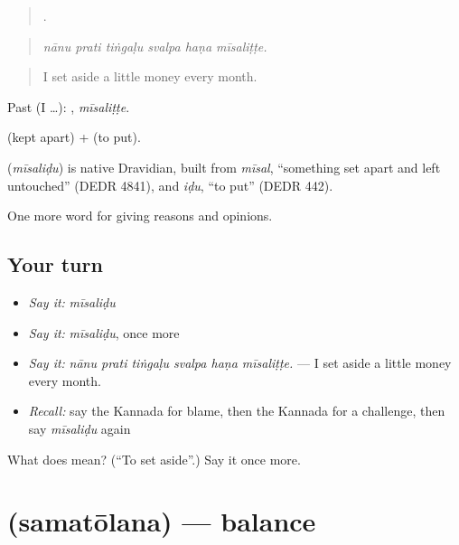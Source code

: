 \begin{quote}
     .
\end{quote}

\begin{quote}
\emph{nānu prati tiṅgaḷu svalpa haṇa mīsaliṭṭe.}
\end{quote}

\begin{quote}
I set aside a little money every month.
\end{quote}

Past (I …): , \emph{mīsaliṭṭe}.

 (kept apart) +  (to put).

\begin{cousinweb}
\textbf{} (\emph{mīsaliḍu}) is native Dravidian, built from \emph{mīsal}, \textquotedblleft{}something set apart and left untouched\textquotedblright{} (DEDR 4841), and \emph{iḍu}, \textquotedblleft{}to put\textquotedblright{} (DEDR 442).
\end{cousinweb}

\begin{grammarlens}[title={What you've built}]
One more word for giving reasons and opinions.
\end{grammarlens}

\subsection*{Your turn}
\begin{itemize}
\raggedright
  \item \emph{Say it:} \emph{mīsaliḍu}
  \item \emph{Say it:} \emph{mīsaliḍu}, once more
  \item \emph{Say it:} \emph{nānu prati tiṅgaḷu svalpa haṇa mīsaliṭṭe.} — I set aside a little money every month.
  \item \emph{Recall:} say the Kannada for blame, then the Kannada for a challenge, then say \emph{mīsaliḍu} again
\end{itemize}

\begin{tcolorbox}[breakable,colback=teal!4,colframe=teal!35!black,title={Before you move on}]
What does  mean? (\textquotedblleft{}To set aside\textquotedblright{}.) Say it once more.
\end{tcolorbox}
\section[\texorpdfstring{\kn{ಸಮತೋಲನ} (samatōlana)}{ಸಮತೋಲನ (samatōlana)}]{ (samatōlana) — balance}

